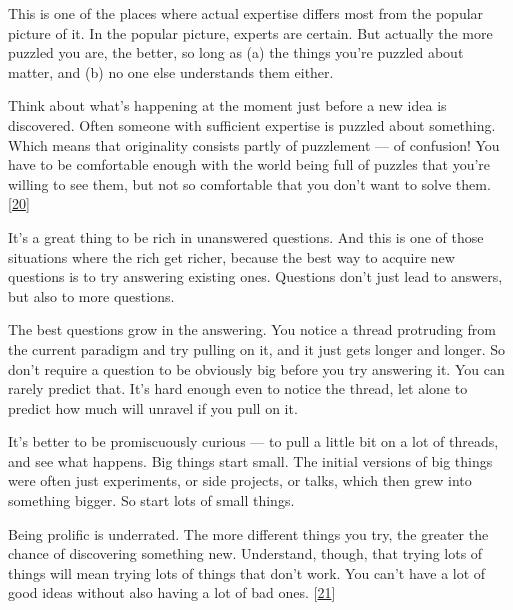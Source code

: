 This is one of the places where actual expertise
                  differs most from the popular picture of it. In the popular
                  picture, experts are certain. But actually the more puzzled
                  you are, the better, so long as (a) the things you're puzzled
                  about matter, and (b) no one else understands them either.

Think
                  about what's happening at the moment just before a new idea is
                  discovered. Often someone with sufficient expertise is puzzled
                  about something. Which means that originality consists partly
                  of puzzlement --- of confusion! You have to be comfortable
                  enough with the world being full of puzzles that you're
                  willing to see them, but not so comfortable that you don't
                  want to solve them.
                  [\href{\#f20n}{20}]

It's a great thing to be rich in unanswered
                  questions. And this is one of those situations where the rich
                  get richer, because the best way to acquire new questions is
                  to try answering existing ones. Questions don't just lead to
                  answers, but also to more questions.






                  The best questions grow in the answering. You notice a thread
                  protruding from the current paradigm and try pulling on it,
                  and it just gets longer and longer. So don't require a
                  question to be obviously big before you try answering it. You
                  can rarely predict that. It's hard enough even to notice the
                  thread, let alone to predict how much will unravel if you pull
                  on it.

It's better to be promiscuously curious
                  --- to pull a little bit on a lot of threads, and see what
                  happens. Big things start small. The initial versions of big
                  things were often just experiments, or side projects, or
                  talks, which then grew into something bigger. So start lots of
                  small things.

Being prolific is underrated. The
                  more different things you try, the greater the chance of
                  discovering something new. Understand, though, that trying
                  lots of things will mean trying lots of things that don't
                  work. You can't have a lot of good ideas without also having a
                  lot of bad ones.
                  [\href{\#f21n}{21}]

